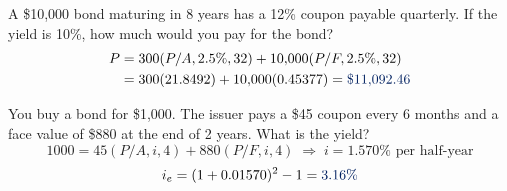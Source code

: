
\begin{example}
    A \$10,000 bond maturing in 8 years has a 12\% coupon payable quarterly.
    If the yield is 10\%, how much would you pay for the bond?
    \\
    \begin{align*}
        P &= 300(P/A,2.5\%,32) + 10{,}000(P/F,2.5\%,32)\\
        &= 300(21.8492) + 10{,}000(0.45377) = \db{\$11{,}092.46}
    \end{align*}
\end{example}

\begin{example}
    You buy a bond for \$1,000. The issuer pays a \$45 coupon every 6 months
    and a face value of \$880 at the end of 2 years. What is the
     yield?
    \\
    \[1000 = 45(P/A,i,4) + 880(P/F,i,4) \;\Rightarrow\; i = 1.570\% \text{ per half-year}\]
    \[i_e = (1 + 0.01570)^2 - 1 = \db{3.16\%}\]
\end{example}

